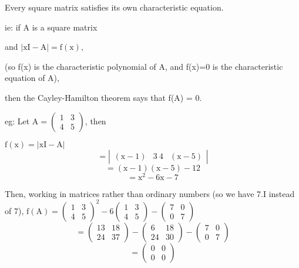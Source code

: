 Every square matrix satisfies its own characteristic equation.
\par
ie: if A is a square matrix 
\par
and $ \left | \mathrm{xI - A} \right | = \mathrm{f(x)}, $
\par
(so f(x) is the characteristic
polynomial of A, and f(x)=0 is the characteristic equation of A), 
\par
then the 
Cayley-Hamilton theorem says that f(A) = 0.
\par
eg: Let $ \mathrm{A} = 
\left( \begin{array}{cc} 
  1 & 3 \\ 
  4 & 5
\end{array}
\right) $, then
\par
$ \mathrm{f(x)} = \left | \mathrm{xI - A} \right | $ 
\[ = 
\left| 
\begin{array}{ccc}
( \mathrm{x} -1) & 3 \ 4 & ( \mathrm{x} -5) 
\end{array}
\right| 
\]
\[ = \mathrm{(x-1)(x-5) - 12} \]
\[ = \mathrm{x}^2 -6 \mathrm{x} -7 \]
\par
Then, working in matrices rather than ordinary numbers (so we have 7.I instead of 7),
 $ \mathrm{f(A)} 
= \left( 
\begin{array}{cc}
  1 & 3 \\
  4 & 5
\end{array} 
\right) ^2 - 6 
\left( 
\begin{array}{cc}
  1 & 3 \\
  4 & 5 
\end{array} 
\right) - 
\left(
\begin{array}{cc}
  7 & 0 \\
  0 & 7 
\end{array} 
\right) $
\[ = \left( 
\begin{array}{cc}
  13 & 18 \\
  24 & 37 
\end{array} 
\right) 
- \left( 
\begin{array}{cc} 
  6 & 18 \\
  24 & 30 
\end{array} 
\right) 
- \left( 
\begin{array}{cc}
  7 & 0 \\
  0 & 7 
\end{array} 
\right) \]
\[ = \left( 
\begin{array}{cc}
  0 & 0 \\
  0 & 0 
\end{array}
\right )
\]